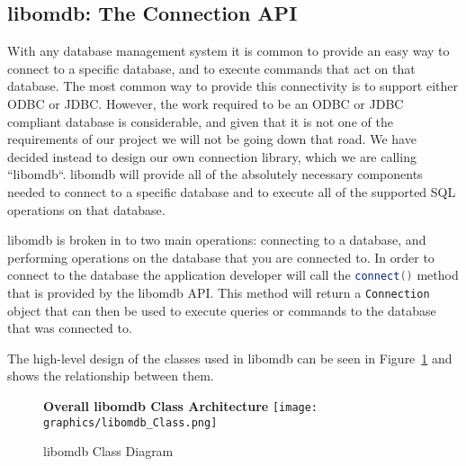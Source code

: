 \documentclass[letterpaper, 12pt]{article}
\newcommand{\inlinecode}[1]{\colorbox{codegrey}{\lstinline[language=C++]{#1}}}
\begin{document}
  \subsection{libomdb: The Connection API}
  With any database management system it is common to provide an easy way to connect
  to a specific database, and to execute commands that act on that database. The most common
  way to provide this connectivity is to support either ODBC or JDBC. However, the work
  required to be an ODBC or JDBC compliant database is considerable, and given that it is
  not one of the requirements of our project we will not be going down that road. We have
  decided instead to design our own connection library, which we are calling
  ``libomdb``. libomdb will provide all of the absolutely necessary components needed to
  connect to a specific database and to execute all of the supported SQL operations on
  that database.
  \par\vspace{\baselineskip}
  libomdb is broken in to two main operations: connecting to a database, and performing
  operations on the database that you are connected to. In order to connect to the database
  the application developer will call the
  \inlinecode{connect()} method that is provided by the libomdb API.
  This method will return a \inlinecode{Connection} object that can
  then be used to execute queries or commands to the database that was connected to.
  \par\vspace{\baselineskip}
  
  The high-level design of the classes used in libomdb can be seen in Figure~\ref{fig:lib_class}
  and shows the relationship between them.

  \begin{figure}
    \centering
    \textbf{Overall libomdb Class Architecture}
    \texttt{[image: graphics/libomdb\_Class.png]}
    \caption{libomdb Class Diagram}
    \label{fig:lib_class}
  \end{figure}
\end{document}
